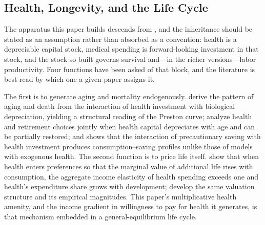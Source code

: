 \documentclass[12pt,a4paper]{article}
\begin{document}
\subsection{Health, Longevity, and the Life Cycle}
\label{subsec:lit_longevity}

The apparatus this paper builds descends from \citet{Grossman1972}, and the
inheritance should be stated as an assumption rather than absorbed as a
convention: health is a depreciable capital stock, medical spending is
forward-looking investment in that stock, and the stock so built governs
survival and---in the richer versions---labor productivity. Four functions have
been asked of that block, and the literature is best read by which one a given
paper assigns it.

The first is to generate aging and mortality endogenously.
\citet{DalgaardStrulik2014} derive the pattern of aging and death from the
interaction of health investment with biological depreciation, yielding a
structural reading of the Preston curve; \citet{KuhnFeichtinger2015} analyze
health and retirement choices jointly when health capital depreciates with age
and can be partially restored; and \citet{Fioroni2010} shows that the
interaction of precautionary saving with health investment produces
consumption--saving profiles unlike those of models with exogenous health. The
second function is to price life itself. \citet{HallJones2007} show that when
health enters preferences so that the marginal value of additional life rises
with consumption, the aggregate income elasticity of health spending exceeds one and
health's expenditure share grows with development; \citet{MurphyTopel2006}
develop the same valuation structure and its empirical magnitudes. This paper's
multiplicative health amenity, and the income gradient in willingness to pay
for health it generates, is that mechanism embedded in a general-equilibrium
life cycle.
\end{document}
